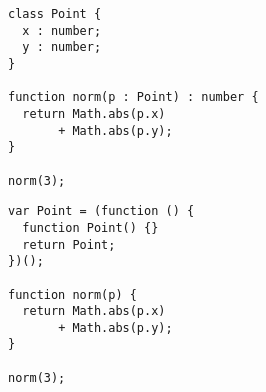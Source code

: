 \begin{minipage}{0.4\textwidth}
\flushleft
\begin{verbatim}
class Point {
  x : number;
  y : number;
}

function norm(p : Point) : number {
  return Math.abs(p.x)
       + Math.abs(p.y);
}

norm(3);
\end{verbatim}
\end{minipage}%
\hfill%
\begin{minipage}{0.4\textwidth}
  \flushright
  \begin{verbatim}
var Point = (function () {
  function Point() {}
  return Point;
})();

function norm(p) {
  return Math.abs(p.x)
       + Math.abs(p.y);
}

norm(3);
\end{verbatim}
\end{minipage}
